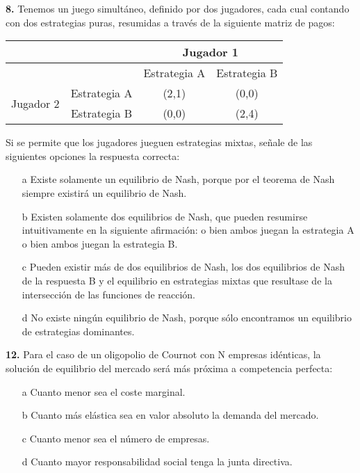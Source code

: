 \documentclass{nuevotema}
\begin{document}
\textbf{8.} Tenemos un juego simultáneo, definido por dos jugadores, cada cual contando con dos estrategias puras, resumidas a través de la siguiente matriz de pagos:

\medskip

\begin{center}
\begin{tabular}{c  c  c  c}

& & \multicolumn{2}{c}{Jugador 1}\\ \hline

& & Estrategia A & Estrategia B\\ \hline


\multirow{2}{*}{Jugador 2}& Estrategia A & (2,1) & (0,0) \\
& Estrategia B & (0,0) & (2,4) \\ \hline

\end{tabular}

\end{center}

\medskip

Si se permite que los jugadores jueguen estrategias mixtas, señale de las siguientes opciones la respuesta correcta:

\begin{enumerate}
	\item[a] Existe solamente un equilibrio de Nash, porque por el teorema de Nash siempre existirá un equilibrio de Nash.
	\item[b] Existen solamente dos equilibrios de Nash, que pueden resumirse intuitivamente en la siguiente afirmación: o bien ambos juegan la estrategia A o bien ambos juegan la estrategia B.
	\item[c] Pueden existir más de dos equilibrios de Nash, los dos equilibrios de Nash de la respuesta B y el equilibrio en estrategias mixtas que resultase de la intersección de las funciones de reacción.
	\item[d] No existe ningún equilibrio de Nash, porque sólo encontramos un equilibrio de estrategias dominantes.
\end{enumerate}

\textbf{12.} Para el caso de un oligopolio de Cournot con N empresas idénticas, la solución de equilibrio del mercado será más próxima a competencia perfecta:

\begin{enumerate}
	\item[a] Cuanto menor sea el coste marginal.
	\item[b] Cuanto más elástica sea en valor absoluto la demanda del mercado.
	\item[c] Cuanto menor sea el número de empresas.
	\item[d] Cuanto mayor responsabilidad social tenga la junta directiva.
\end{enumerate}
\end{document}
